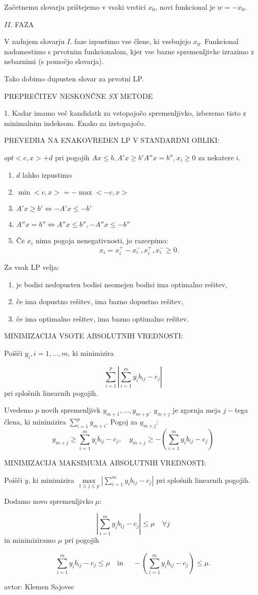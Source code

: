 \documentclass[10pt,a4paper]{amsart}
\theoremstyle{definition} %
\theoremstyle{plain} %
\begin{document}
Začetnemu slovarju prištejemo v vsaki vrstici $x_0$, novi funkcional je $w=-x_0$.

$II.$ FAZA

V zadnjem slovarju $I.$ faze izpustimo vse člene, ki vsebujejo $x_0$. Funkcional nadomestimo s prvotnim funkcionalom, kjer vse bazne spremenljivke izrazimo z nebaznimi (s pomočjo slovarja).

Tako dobimo dupusten slovar za prvotni LP.


PREPREČITEV NESKONČNE \emph{SX} METODE

1. Kadar imamo več kandidatk za vstopajočo spremenljivko, izberemo tisto z minimalnim indeksom. Enako za izstopajočo.


PREVEDBA NA ENAKOVREDEN LP V STANDARDNI OBLIKI:

$opt<c,x>+d$ pri pogojih $Ax \leq b, A'x \geq b' A''x = b'', x_i \geq 0$ za nekatere $i$.
\begin{enumerate}
\item $d$ lahko izpustimo
\item $\min <c,x> = - \max <-c,x>$
\item $A'x \geq b' \Longleftrightarrow -A'x \leq -b'$
\item $A''x = b'' \Longleftrightarrow A''x \leq b'', -A''x \leq -b''$
\item Če $x_i$ nima pogoja nenegativnosti, jo razcepimo:
$$
x_i = x_i^+ - x_i^-, x_i^+,x_i^- \geq 0.
$$
\end{enumerate}

Za vsak LP velja:
\begin{enumerate}
\item je bodisi nedopusten bodisi neomejen bodisi ima optimalno rešitev,
\item če ima dopustno rešitev, ima bazno dopustno rešitev,
\item če ima optimalno rešitev, ima bazno optimalno rešitev.
\end{enumerate}

MINIMIZACIJA VSOTE ABSOLUTNIH VREDNOSTI:

Poišči $y_i, i = 1,\dots , m$, ki minimizira

$$
\sum \limits_{i=1}^{p}|\sum \limits_{i=1}^{m}y_ib_{ij}-c_j|
$$
pri splošnih linearnih pogojih.

Uvedemo $p$ novih spremenljivk $y_{m+1},\dots ,y_{m+p}$. $y_{m+j}$ je zgornja meja $j-$tega člena, ki minimizira $\sum \limits_{i=1}^{p}y_{m+i}$. Pogoj za $y_{m+j}$:
$$
y_{m+j} \geq \sum \limits_{i=1}^{m}y_ib_{ij} -c_j, \quad y_{m+j} \geq -(\sum \limits_{i=1}^{m}y_ib_{ij} -c_j)
$$

MINIMIZACIJA MAKSIMUMA ABSOLUTNIH VREDNOSTI:

Poišči $y$, ki minimizira $\max \limits_{1\leq j \leq p} |\sum \limits_{i=1}^{m}y_ib_{ij} -c_j |$ pri splošnih linearnih pogojih.

Dodamo novo spremenljivko $\mu$:

$$
|\sum \limits_{i=1}^{m}y_ib_{ij} -c_j | \leq \mu \quad \forall j
$$
in minimiziramo $\mu$ pri pogojih

$$
\sum \limits_{i=1}^{m}y_ib_{ij} -c_j \leq \mu \quad \text{in }\quad -(\sum \limits_{i=1}^{m}y_ib_{ij} -c_j ) \leq \mu.
$$


\vfill\hfill avtor: Klemen Sajovec
\end{document}
